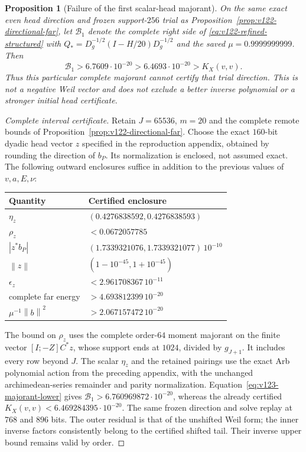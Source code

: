 \documentclass[11pt]{article}
\newtheorem{proposition}[theorem]{Proposition}
\theoremstyle{remark}
\newcommand{\norm}[1]{\left\lVert #1\right\rVert}
\begin{document}
\begin{proposition}[Failure of the first scalar-head majorant]
\label{prop:v123-first-majorant-fails}
On the same exact even head direction and frozen support-$256$
trial as Proposition~\ref{prop:v122-directional-far}, let
$\mathcal B_1$ denote the complete right side of
\eqref{eq:v122-refined-structured} with
$Q_*=D_g^{-1/2}(I-H/20)D_g^{-1/2}$ and the saved
$\mu=0.9999999999$. Then
\begin{equation}\label{eq:v123-first-majorant-fails}
 \mathcal B_1>6.7609\cdot10^{-20}
 >6.4693\cdot10^{-20}>K_X(v,v).
\end{equation}
Thus this particular complete majorant cannot certify that trial
direction. This is not a negative Weil vector and does not exclude
a better inverse polynomial or a stronger initial head certificate.
\end{proposition}
\begin{proof}[Complete interval certificate]
Retain $J=65536$, $m=20$ and the complete remote bounds of
Proposition~\ref{prop:v122-directional-far}. Choose the exact
$160$-bit dyadic head vector $z$ specified in the reproduction
appendix, obtained by rounding the direction of $b_P$. Its
normalization is enclosed, not assumed exact. The following
outward enclosures suffice in addition to the previous values of
$v,a,E,\nu$:
\begin{center}
\begin{tabular}{@{}ll@{}}
\toprule Quantity & Certified enclosure\\\midrule
$\eta_z$ & $(0.4276838592,0.4276838593)$\\
$\rho_z$ & $<0.0672057785$\\
$|z^*b_P|$ & $(1.7339321076,1.7339321077)\,10^{-10}$\\
$\norm z$ & $(1-10^{-45},1+10^{-45})$\\
$\epsilon_z$ & $<2.961708367\,10^{-11}$\\
complete far energy & $>4.693812399\,10^{-20}$\\
$\mu^{-1}\norm b^2$ & $>2.067157472\,10^{-20}$\\\bottomrule
\end{tabular}
\end{center}
The bound on $\rho_z$ uses the complete order-$64$ moment
majorant on the finite vector $[I;-Z]C^*z$, whose support ends
at $1024$, divided by $g_{J+1}$. It includes every row beyond
$J$. The scalar $\eta_z$ and the retained pairings use the exact
Arb polynomial action from the preceding appendix, with the
unchanged archimedean-series remainder and parity normalization.
Equation~\eqref{eq:v123-majorant-lower} gives
$\mathcal B_1>6.760969872\cdot10^{-20}$, whereas the already
certified $K_X(v,v)<6.469284395\cdot10^{-20}$.
The same frozen direction and solve replay at $768$ and $896$
bits. The outer residual is that of the unshifted Weil form;
the inner inverse factors consistently belong to the certified
shifted tail. Their inverse upper bound remains valid by order.
\end{proof}
\end{document}
